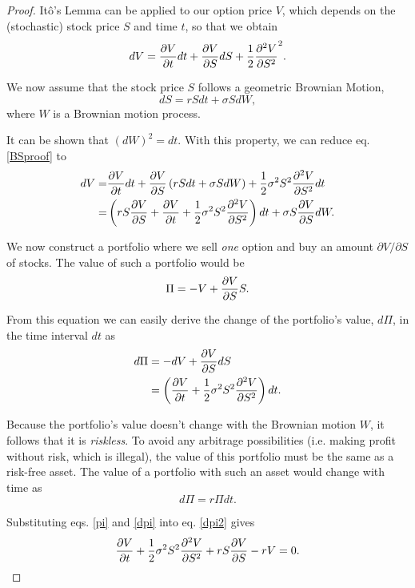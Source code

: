 \begin{proof}
Itô's Lemma can be applied to our option price $V$, which depends on the (stochastic) stock price $S$ and time $t$, so that we obtain
\begin{equation}\label{BSproof}
dV=\pdv{V}{t}dt+\pdv{V}{S}dS+\frac{1}{2}\pdv{^2V}{S^2} (dS)^2.
\end{equation}

We now assume that the stock price $S$ follows a geometric Brownian Motion,
\begin{equation}
dS=rSdt+\sigma SdW,
\end{equation}
\noindent where $W$ is a Brownian motion process.

It can be shown that $(dW)^2=dt$. With this property, we can reduce eq. \eqref{BSproof} to
\begin{equation}
\begin{split}
dV=&\pdv{V}{t}dt+\pdv{V}{S}\left(rSdt+\sigma SdW\right)+\frac{1}{2}\sigma^2S^2\pdv{^2V}{S^2}dt\\
=&\left(rS\pdv{V}{S}+\pdv{V}{t}+\frac{1}{2}\sigma^2S^2\pdv{^2V}{S^2}\right)dt+\sigma S\pdv{V}{S}dW.
\end{split}
\end{equation}


We now construct a portfolio where we sell \emph{one} option and buy an amount $\partial V/\partial S$ of stocks. The value of such a portfolio would be
\begin{equation}\label{pi}
\Pi=-V+\pdv{V}{S}S.
\end{equation}

From this equation we can easily derive the change of the portfolio's value, $d\Pi$, in the time interval $dt$ as
\begin{equation}\label{dpi}
\begin{split}
d\Pi&=-dV+\pdv{V}{S}dS\\
&=\left(\pdv{V}{t}+\frac{1}{2}\sigma^2S^2\pdv{^2V}{S^2}\right)dt.
\end{split}
\end{equation}

Because the portfolio's value doesn't change with the Brownian motion $W$, it follows that it is \emph{riskless}.
To avoid any arbitrage possibilities (i.e. making profit without risk, which is illegal), the value of this portfolio must be the same as a risk-free asset. The value of a portfolio with such an asset would change with time as
\begin{equation}\label{dpi2}
d\Pi=r\Pi dt.
\end{equation}

Substituting eqs. \eqref{pi} and \eqref{dpi} into eq. \eqref{dpi2} gives
\begin{equation}
\pdv{V}{t}+\frac{1}{2}\sigma^2S^2\pdv{^2V}{S^2}+rS\pdv{V}{S}-rV=0.
\end{equation}

\end{proof}


